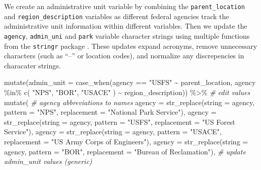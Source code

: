 \documentclass[
  11 pt,
  openany]{book}
\newenvironment{Shaded}{\begin{snugshade}}{\end{snugshade}}
\newcommand{\AttributeTok}[1]{\textcolor[rgb]{0.77,0.63,0.00}{#1}}
\newcommand{\CommentTok}[1]{\textcolor[rgb]{0.56,0.35,0.01}{\textit{#1}}}
\newcommand{\FunctionTok}[1]{\textcolor[rgb]{0.00,0.00,0.00}{#1}}
\newcommand{\NormalTok}[1]{#1}
\newcommand{\SpecialCharTok}[1]{\textcolor[rgb]{0.00,0.00,0.00}{#1}}
\newcommand{\StringTok}[1]{\textcolor[rgb]{0.31,0.60,0.02}{#1}}
\begin{document}
We create an administrative unit variable by combining the \texttt{parent\_location} and \texttt{region\_description} variables as different federal agencies track the administrative unit information within different variables. Then we update the \texttt{agency}, \texttt{admin\_uni} and \texttt{park} variable character strings using multiple functions from the \texttt{stringr} package \citep{R-stringr}. These updates expand acronyms, remove unnecessary characters (such as ``--'' or location codes), and normalize any discrepencies in characater strings.

\begin{Shaded}
\begin{Highlighting}[]
\FunctionTok{mutate}\NormalTok{(}\AttributeTok{admin\_unit =} 
         \FunctionTok{case\_when}\NormalTok{(agency }\SpecialCharTok{==} \StringTok{"USFS"} \SpecialCharTok{\textasciitilde{}}\NormalTok{ parent\_location,}
\NormalTok{                   agency }\SpecialCharTok{\%in\%} \FunctionTok{c}\NormalTok{(}
                     \StringTok{"NPS"}\NormalTok{, }\StringTok{"BOR"}\NormalTok{, }\StringTok{"USACE"}
\NormalTok{                   ) }\SpecialCharTok{\textasciitilde{}}\NormalTok{ region\_description)) }\SpecialCharTok{\%\textgreater{}\%} 
  \CommentTok{\# edit values}
  \FunctionTok{mutate}\NormalTok{(}
    \CommentTok{\# agency abbreviations to names}
    \AttributeTok{agency =} \FunctionTok{str\_replace}\NormalTok{(}\AttributeTok{string =}\NormalTok{ agency,}
                         \AttributeTok{pattern =} \StringTok{"NPS"}\NormalTok{,}
                         \AttributeTok{replacement =} \StringTok{"National Park Service"}\NormalTok{),}
    \AttributeTok{agency =} \FunctionTok{str\_replace}\NormalTok{(}\AttributeTok{string =}\NormalTok{ agency,}
                         \AttributeTok{pattern =} \StringTok{"USFS"}\NormalTok{, }
                         \AttributeTok{replacement =} \StringTok{"US Forest Service"}\NormalTok{),}
    \AttributeTok{agency =} \FunctionTok{str\_replace}\NormalTok{(}\AttributeTok{string =}\NormalTok{ agency,}
                         \AttributeTok{pattern =} \StringTok{"USACE"}\NormalTok{,}
                         \AttributeTok{replacement =} \StringTok{"US Army Corps of Engineers"}\NormalTok{),}
    \AttributeTok{agency =} \FunctionTok{str\_replace}\NormalTok{(}\AttributeTok{string =}\NormalTok{ agency,}
                         \AttributeTok{pattern =} \StringTok{"BOR"}\NormalTok{,}
                         \AttributeTok{replacement =} \StringTok{"Bureau of Reclamation"}\NormalTok{),}
    \CommentTok{\# update admin\_unit values (generic)}

\end{Highlighting}
\end{Shaded}
\end{document}

